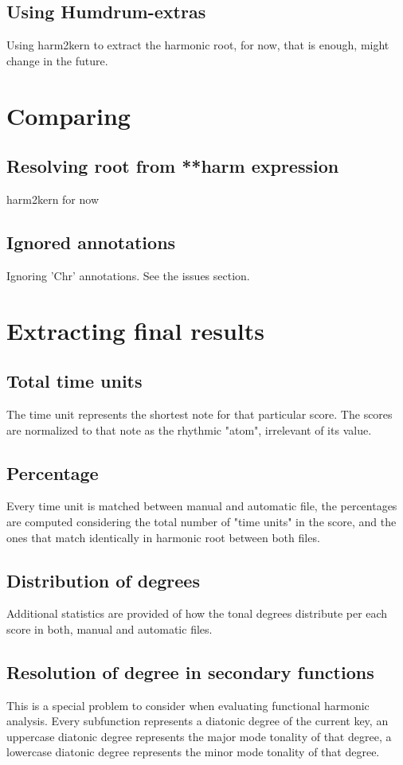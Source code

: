 	\subsection{Using Humdrum-extras}
  Using harm2kern to extract the harmonic root, for now, that is enough, might change in the future.
\section{Comparing}
	\subsection{Resolving root from **harm expression}
  harm2kern for now
	\subsection{Ignored annotations}
  Ignoring 'Chr' annotations. See the issues section.
\section{Extracting final results}
	\subsection{Total time units}
  The time unit represents the shortest note for that particular score. The scores are normalized to that note as the rhythmic "atom", irrelevant of its value.
	\subsection{Percentage}
  Every time unit is matched between manual and automatic file, the percentages are computed considering the total number of "time units" in the score, and the ones that match identically in harmonic root between both files.
	\subsection{Distribution of degrees}
  Additional statistics are provided of how the tonal degrees distribute per each score in both, manual and automatic files.
	\subsection{Resolution of degree in secondary functions}
  This is a special problem to consider when evaluating functional harmonic analysis. Every subfunction represents a diatonic degree of the current key, an uppercase diatonic degree represents the major mode tonality of that degree, a lowercase diatonic degree represents the minor mode tonality of that degree.

\newpage

